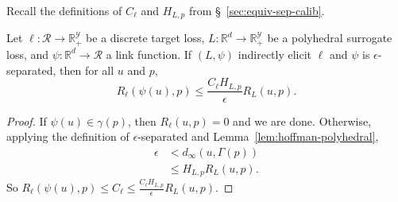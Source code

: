 \documentclass[twoside,11pt]{article}
\newcommand{\reals}{\mathbb{R}}
\newcommand{\R}{\mathcal{R}}
\newcommand{\Y}{\mathcal{Y}}
\begin{document}
Recall the definitions of $C_\ell$ and $H_{L,p}$ from \S~\ref{sec:equiv-sep-calib}.

\begin{lemma}\label{lem:separated-constant-p}
  Let $\ell: \R \to \reals_+^{\Y}$ be a discrete target loss, $L: \reals^d \to \reals_+^{\Y}$ be a polyhedral surrogate loss, and $\psi: \reals^d \to \R$ a link function.
  If $(L,\psi)$ indirectly elicit $\ell$ and $\psi$ is $\epsilon$-separated, then for all $u$ and $p$,
    \[ R_{\ell}(\psi(u),p) \leq \frac{C_{\ell} H_{L,p}}{\epsilon} R_L(u,p) . \]
\end{lemma}
\begin{proof}
  If $\psi(u) \in \gamma(p)$, then $R_{\ell}(u,p) = 0$ and we are done.
  Otherwise, applying the definition of $\epsilon$-separated and Lemma~\ref{lem:hoffman-polyhedral},
  \begin{align*}
    \epsilon &<    d_{\infty}(u,\Gamma(p))  \\
             &\leq H_{L,p} R_L(u,p) .
  \end{align*}
  So $R_{\ell}(\psi(u),p) \leq C_{\ell} \leq \frac{C_{\ell} H_{L,p}}{\epsilon} R_L(u,p)$.
\end{proof}
\end{document}
